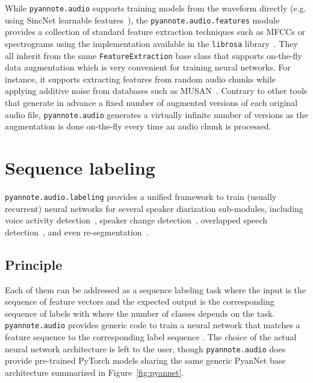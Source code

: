 \documentclass{article}
\begin{document}
While {\small\texttt{pyannote.audio}} supports training models from the waveform directly (e.g. using SincNet learnable features~\cite{Ravanelli2018}), the {\small\texttt{pyannote.audio.features}} module provides a collection of standard feature extraction techniques such as MFCCs or spectrograms using the implementation available in  the {\small\texttt{librosa}} library~\cite{librosa}. They all inherit from the same {\small\texttt{FeatureExtraction}} base class that supports on-the-fly data augmentation which is very convenient for training neural networks. For instance, it supports extracting features from random audio chunks while applying  additive noise from databases such as MUSAN~\cite{musan}. Contrary to other tools that generate in advance a fixed number of augmented versions of each original audio file, {\small\texttt{pyannote.audio}} generates a virtually infinite number of versions as the augmentation is done on-the-fly every time an audio chunk is processed.

\vspace{-0.17cm}
\section{Sequence labeling}
\label{sec:labeling}

{\small\texttt{pyannote.audio.labeling}} provides a unified framework to train (usually recurrent) neural networks for several speaker diarization sub-modules, including voice activity detection~\cite{Gelly2018}, speaker change detection~\cite{Yin2017}, overlapped speech detection~\cite{Bullock2020}, and even re-segmentation~\cite{Yin2018}.

\vspace{-0.17cm}
\subsection{Principle}
\label{ssec:principle}

Each of them can be addressed as a sequence labeling task where the input is the sequence of feature vectors  and the expected output is the corresponding sequence of labels  with  where the number of classes  depends on the task. {\small\texttt{pyannote.audio}} provides generic code to train a neural network  that matches a feature sequence  to the corresponding label sequence . The choice of the actual neural network architecture is left to the user, though {\small\texttt{pyannote.audio}} does provide pre-trained PyTorch models sharing the same generic PyanNet base architecture summarized in Figure~\ref{fig:pyannet}.
\end{document}
